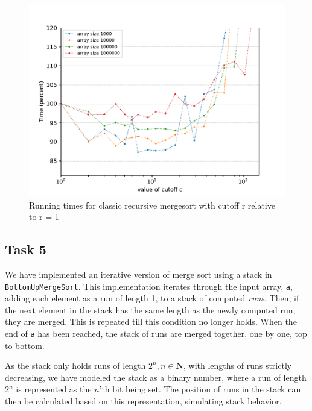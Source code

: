 \documentclass[11pt, a4paper]{article}
\begin{document}
\begin{figure}[h]
  \begin{center}
    \includegraphics[width=\textwidth]{plot/t4p1.pdf}
    \caption{Running times for classic recursive mergesort with cutoff r relative to r = 1}
    \label{fig:runtimes}
  \end{center}
\end{figure}

\subsection{Task 5}

We have implemented an iterative version of merge sort using a stack in \verb|BottomUpMergeSort|. This implementation iterates through the input array, \verb|a|, adding each element as a run of length 1, to a stack of computed \textit{runs}. Then, if the next element in the stack has the same length as the newly computed run, they are merged. This is repeated till this condition no longer holds. 
When the end of \verb|a| has been reached, the stack of runs are merged together, one by one, top to bottom.

As the stack only holds runs of length $2^n, n\in \mathbf{N}$, with lengths of runs strictly decreasing, we have modeled the stack as a binary number, where a run of length $2^n$ is represented as the $n$'th bit being set. The position of runs in the stack can then be calculated based on this representation, simulating stack behavior.
\end{document}
